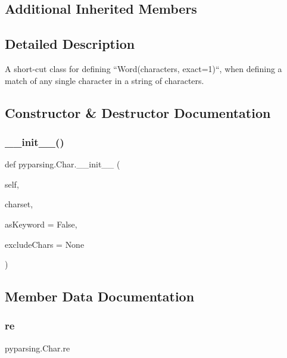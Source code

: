 \subsection*{Additional Inherited Members}


\subsection{Detailed Description}
\begin{DoxyVerb}A short-cut class for defining ``Word(characters, exact=1)``,
when defining a match of any single character in a string of
characters.
\end{DoxyVerb}
 

\subsection{Constructor \& Destructor Documentation}
\mbox{\label{classpyparsing_1_1Char_ac4ee239ff99c41a1648c50854fcb5af5}} 
\subsubsection{\texorpdfstring{\+\_\+\+\_\+init\+\_\+\+\_\+()}{\_\_init\_\_()}}
{\footnotesize\ttfamily def pyparsing.\+Char.\+\_\+\+\_\+init\+\_\+\+\_\+ (\begin{DoxyParamCaption}\item[{}]{self,  }\item[{}]{charset,  }\item[{}]{as\+Keyword = {\ttfamily False},  }\item[{}]{exclude\+Chars = {\ttfamily None} }\end{DoxyParamCaption})}



\subsection{Member Data Documentation}
\mbox{\label{classpyparsing_1_1Char_acb9d929d071f3e317a1c98e7f7a1fa58}} 
\subsubsection{\texorpdfstring{re}{re}}
{\footnotesize\ttfamily pyparsing.\+Char.\+re}

